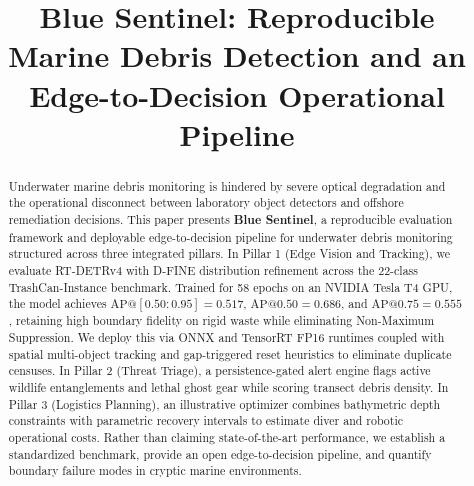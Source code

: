 \documentclass[conference]{IEEEtran}
\begin{document}
\title{Blue Sentinel: Reproducible Marine Debris Detection and an Edge-to-Decision Operational Pipeline}

\author{
}

\maketitle

\begin{abstract}
Underwater marine debris monitoring is hindered by severe optical degradation and the operational disconnect between laboratory object detectors and offshore remediation decisions. This paper presents \textbf{Blue Sentinel}, a reproducible evaluation framework and deployable edge-to-decision pipeline for underwater debris monitoring structured across three integrated pillars. In Pillar 1 (Edge Vision and Tracking), we evaluate RT-DETRv4 with D-FINE distribution refinement across the 22-class TrashCan-Instance benchmark. Trained for 58 epochs on an NVIDIA Tesla T4 GPU, the model achieves $\text{AP}@[0.50:0.95] = 0.517$, $\text{AP}@0.50 = 0.686$, and $\text{AP}@0.75 = 0.555$, retaining high boundary fidelity on rigid waste while eliminating Non-Maximum Suppression. We deploy this via ONNX and TensorRT FP16 runtimes coupled with spatial multi-object tracking and gap-triggered reset heuristics to eliminate duplicate censuses. In Pillar 2 (Threat Triage), a persistence-gated alert engine flags active wildlife entanglements and lethal ghost gear while scoring transect debris density. In Pillar 3 (Logistics Planning), an illustrative optimizer combines bathymetric depth constraints with parametric recovery intervals to estimate diver and robotic operational costs. Rather than claiming state-of-the-art performance, we establish a standardized benchmark, provide an open edge-to-decision pipeline, and quantify boundary failure modes in cryptic marine environments.
\end{abstract}
\end{document}
